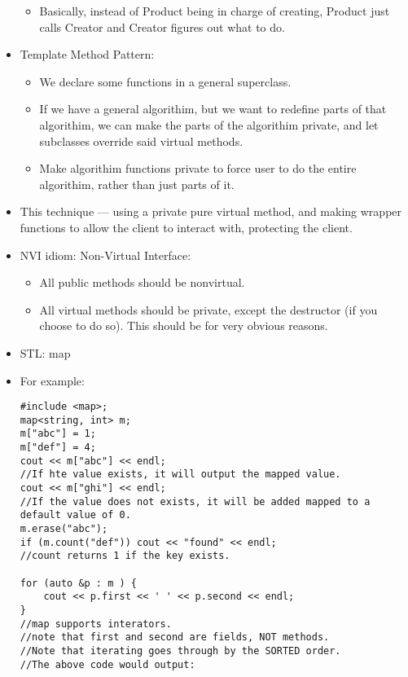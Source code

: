 \documentclass{article}
\begin{document}
\begin{itemize}
\begin{itemize}
\item Basically, instead of Product being in charge of creating, Product just calls Creator and Creator figures out what to do.
\end{itemize}
\item Template Method Pattern:
\begin{itemize}
\item We declare some functions in a general superclass.
\item If we have a general algorithim, but we want to redefine parts of that algorithim, we can make the parts of the algorithim private, and let subclasses override said virtual methods.
\item Make algorithim functions private to force user to do the entire algorithim, rather than just parts of it.
\end{itemize}
\item This technique --- using a private pure virtual method, and making wrapper functions to allow the client to interact with, protecting the client.
\item NVI idiom: Non-Virtual Interface:
\begin{itemize}
\item All public methods should be nonvirtual.
\item All virtual methods should be private, except the destructor (if you choose to do so).  This should be for very obvious reasons.
\end{itemize}
\item STL: map
\item For example:
\begin{lstlisting}
#include <map>;
map<string, int> m;
m["abc"] = 1;
m["def"] = 4;
cout << m["abc"] << endl;
//If hte value exists, it will output the mapped value.
cout << m["ghi"] << endl;
//If the value does not exists, it will be added mapped to a default value of 0.
m.erase("abc");
if (m.count("def")) cout << "found" << endl; 
//count returns 1 if the key exists.

for (auto &p : m ) {
    cout << p.first << ' ' << p.second << endl;
}
//map supports interators.
//note that first and second are fields, NOT methods.
//Note that iterating goes through by the SORTED order.
//The above code would output:


\end{lstlisting}
\end{itemize}
\end{document}
